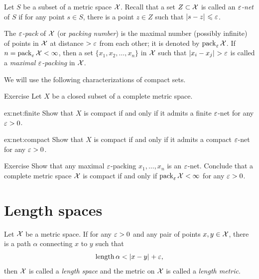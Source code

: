 Let $S$ be a subset of a metric space $\mathcal{X}$.
Recall that a set $Z\subset \mathcal{X}$ is called an \emph{$\varepsilon$-net} of $S$ if for any point $s\in S$, there is a point $z\in Z$ such that $\dist{s}{z}{}\le\eps$.

The \emph{$\varepsilon$-pack} of $\mathcal{X}$ (or \emph{packing number}) is the maximal number (possibly infinite) of points in $\mathcal{X}$ at distance $>\varepsilon$ from each other;
it is denoted by $\operatorname{\rm pack}\nolimits_\varepsilon\mathcal{X}$.
If $n=\operatorname{\rm pack}\nolimits_\varepsilon\mathcal{X}<\infty$, then a set $\{x_1,x_2,\dots,x_n\}$ in $\mathcal{X}$
such that $\dist{x_i}{x_j}{}>\eps$ is called a \emph{maximal $\varepsilon$-packing} in $\mathcal{X}$.

We will use the following characterizations of compact sets.

\begin{thm}[!]{Exercise}\label{ex:net}
Let $X$ be a closed subset of a complete metric space.

\begin{subthm}{ex:net:finite}
Show that $X$ is compact if and only if it admits a finite $\varepsilon$-net for any $\varepsilon>0$.
\end{subthm}

\begin{subthm}{ex:net:compact}
Show that $X$ is compact if and only if it admits a compact $\varepsilon$-net for any $\varepsilon>0$.
\end{subthm}

\end{thm}

\begin{thm}[!]{Exercise}\label{ex:pack-net}
Show that any maximal $\varepsilon$-packing $x_1,\dots,x_n$ is an $\varepsilon$-net.
Conclude that a complete metric space $\mathcal{X}$ is compact if and only if $\pack_\eps\spc{X}\z<\infty$ for any $\varepsilon>0$.
\end{thm}

\section{Length spaces}\label{sec:length}

Let $\mathcal{X}$ be a metric space.
If for any $\varepsilon>0$ and any pair of points $x,y\in\mathcal{X}$, there is a path $\alpha$ connecting $x$ to $y$ such that
\[\length\alpha< \dist{x}{y}{}+\eps,\]
then $\mathcal{X}$ is called a \emph{length space} and the metric on $\mathcal{X}$ is called a \emph{length metric}.\label{page:length metric}

